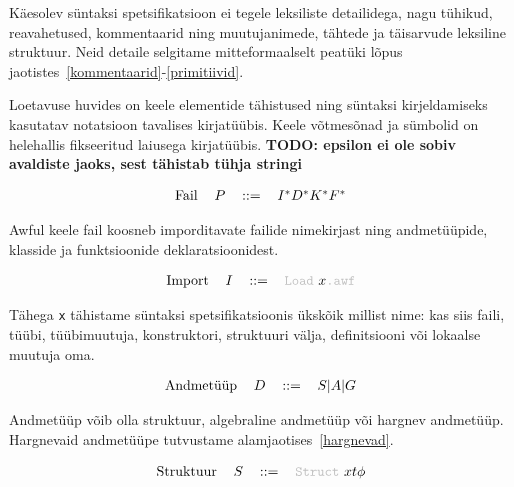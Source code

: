 \documentclass[12pt]{article}
\newcommand\markus[1]{\textcolor{roheline}{\textbf{#1}}}
\begin{document}
    Käesolev süntaksi spetsifikatsioon ei tegele leksiliste detailidega, nagu tühikud, reavahetused, kommentaarid ning muutujanimede, tähtede ja täisarvude leksiline struktuur. Neid detaile selgitame mitteformaalselt peatüki lõpus jaotistes~\ref{kommentaarid}-\ref{primitiivid}.

    Loetavuse huvides on keele elementide tähistused ning süntaksi kirjeldamiseks kasutatav notatsioon tavalises kirjatüübis. Keele võtmesõnad ja sümbolid on helehallis fikseeritud laiusega kirjatüübis. \markus{TODO: epsilon ei ole sobiv avaldiste jaoks, sest tähistab tühja stringi}

    \begin{equation*}
      \begin{tabular}{llll}
        Fail & $P$ & $::=$ & $I^*D^*K^*F^*$
      \end{tabular}
    \end{equation*}

    Awful keele fail koosneb imporditavate failide nimekirjast ning andmetüüpide, klasside ja funktsioonide deklaratsioonidest.

    \begin{equation*}
      \begin{tabular}{llll}
        Import & $I$ & $::=$ & {\color{helehall}\verb!Load!} $x${\color{helehall}\verb!.awf!}
      \end{tabular}
    \end{equation*}

    Tähega \verb!x! tähistame süntaksi spetsifikatsioonis ükskõik millist nime: kas siis faili, tüübi, tüübimuutuja, konstruktori, struktuuri välja, definitsiooni või lokaalse muutuja oma.

    \begin{equation*}
      \begin{tabular}{llll}
        Andmetüüp & $D$ & $::=$ & $S|A|G$
      \end{tabular}
    \end{equation*}

    Andmetüüp võib olla struktuur, algebraline andmetüüp või hargnev andmetüüp. Hargnevaid andmetüüpe tutvustame alamjaotises~\ref{hargnevad}.

    \begin{equation*}
      \begin{tabular}{llll}
        Struktuur & $S$ & $::=$ & {\color{helehall}\verb!Struct!} $xt\phi$
      \end{tabular}
    \end{equation*}
\end{document}
